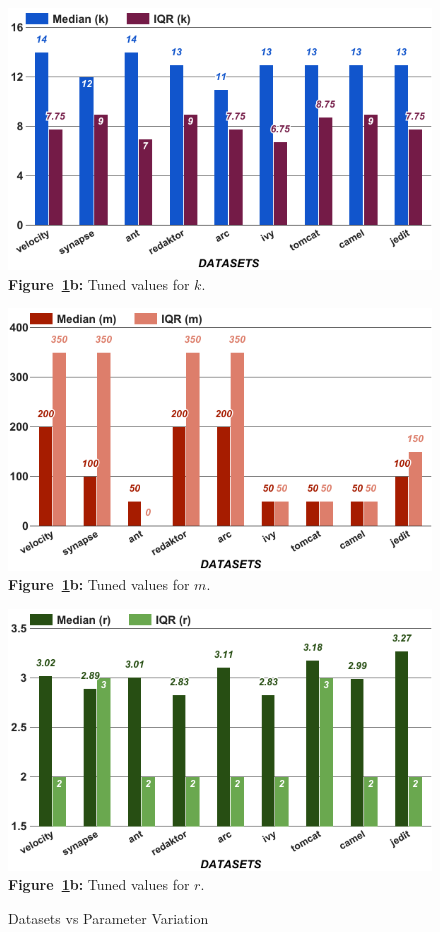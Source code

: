 \begin{figure}[!t]
    \centering
    \begin{minipage}{.33\textwidth}
    \centering
        \includegraphics[width=.95\linewidth]{./fig/k.png}
        {\bf Figure~\ref{fig:para}b:} Tuned values for $k$.
    \end{minipage}%
    \begin{minipage}{.33\textwidth}
    \centering
        \includegraphics[width=.95\linewidth]{./fig/m.png}
        {\bf Figure~\ref{fig:para}b:} Tuned values for $m$.
    \end{minipage}
    \begin{minipage}{.33\textwidth}
    \centering
        \includegraphics[width=.95\linewidth]{./fig/r.png}
        {\bf Figure~\ref{fig:para}b:} Tuned values for $r$.
    \end{minipage}
    \caption{Datasets vs Parameter Variation}
    \label{fig:para}
\end{figure}

